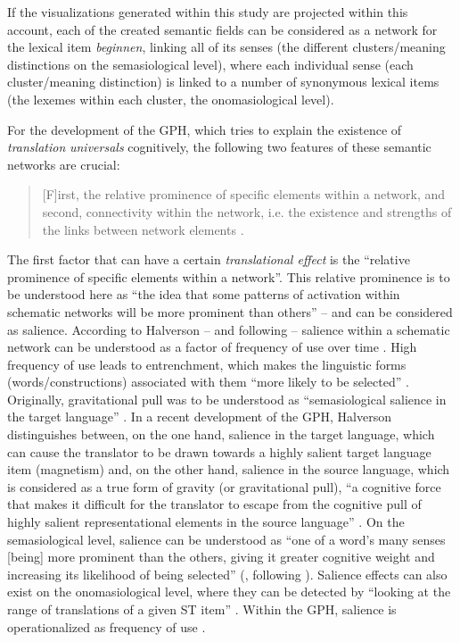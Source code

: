 If the visualizations generated within this study are projected within this account, each of the created semantic fields can be considered as a network for the lexical item \textit{beginnen}, linking all of its senses (the different clusters/meaning distinctions on the semasiological level), where each individual sense (each cluster/meaning distinction) is linked to a number of synonymous lexical items (the lexemes within each cluster, the onomasiological level).

For the development of the GPH, which tries to explain the existence of \textit{translation} \textit{universals} cognitively, the following two features of these semantic networks are crucial:

\begin{quote}
[F]irst, the relative prominence of specific elements within a network, and second, connectivity within the network, i.e. the existence and strengths of the links between network elements \citep[12]{de_sutter_developing_2017}.
\end{quote}

The first factor that can have a certain \textit{translational effect} is the “relative prominence of specific elements within a network”. This relative prominence is to be understood here as “the idea that some patterns of activation within schematic networks will be more prominent than others” \citep[13]{de_sutter_developing_2017} – and can be considered as salience. According to Halverson – and following \citet[226]{langacker_cognitive_2008} – salience within a schematic network can be understood as a factor of frequency of use over time \citep[13]{de_sutter_developing_2017}. High frequency of use leads to entrenchment, which makes the linguistic forms (words/constructions) associated with them “more likely to be selected” \citep[13]{de_sutter_developing_2017}. Originally, gravitational pull \citep{halverson_cognitive_2003} was to be understood as “semasiological salience in the target language” \citep[14]{de_sutter_developing_2017}. In a recent development of the GPH, Halverson distinguishes between, on the one hand, salience in the target language, which can cause the translator to be drawn towards a highly salient target language item (magnetism) and, on the other hand, salience in the source language, which is considered as a true form of gravity (or gravitational pull), “a cognitive force that makes it difficult for the translator to escape from the cognitive pull of highly salient representational elements in the source language” \citep[14]{de_sutter_developing_2017}. On the semasiological level, salience can be understood as “one of a word’s many senses [being] more prominent than the others, giving it greater cognitive weight and increasing its likelihood of being selected” (\citealt[13]{de_sutter_developing_2017}, following \citealt[80]{geeraerts_words_2009}). Salience effects can also exist on the onomasiological level, where they can be detected by “looking at the range of translations of a given ST item” \citep[28]{de_sutter_developing_2017}. Within the GPH, salience is operationalized as frequency of use \citep[13]{de_sutter_developing_2017}.

